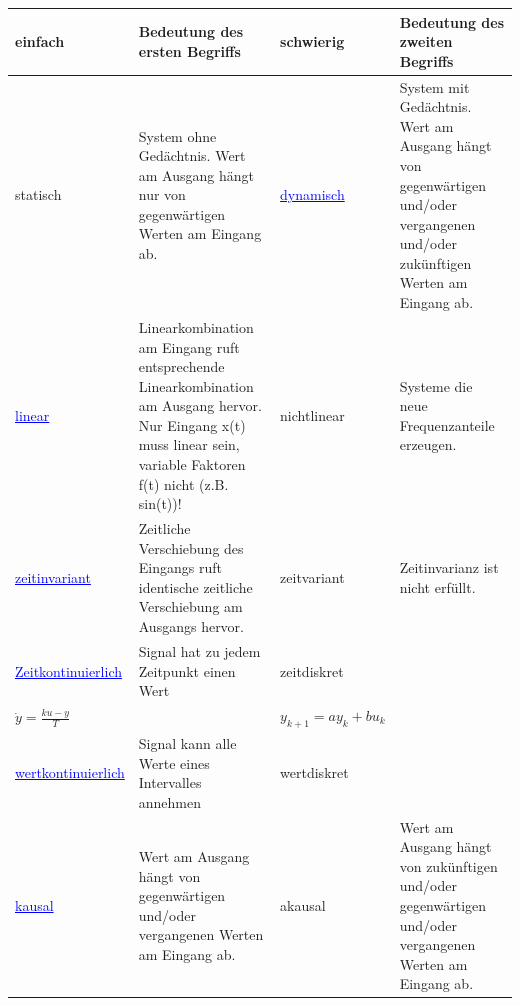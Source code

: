 		\begin{tabular}{|l|p{6.3cm}||l|p{6.3cm}|}
			
	        \hline
	        	
	        	einfach & 
	        	Bedeutung des \textbf{ersten} Begriffs & 
	        	schwierig & 	
	        	Bedeutung des \textbf{zweiten} Begriffs\\
	        \hline
	        	
	        	statisch &
	        	System ohne Gedächtnis.
	        	Wert am Ausgang hängt nur von gegenwärtigen
	        	Werten am Eingang ab.&
	        	\textcolor{blue}{\underline{dynamisch}} &
	        	System mit Gedächtnis.
	        	Wert am Ausgang hängt von gegenwärtigen
	        	und/oder vergangenen und/oder zukünftigen
	        	Werten am Eingang ab.\\
	        \hline
	        	
	        	\textcolor{blue}{\underline{linear}}	&
	        	Linearkombination am Eingang ruft
	        	entsprechende Linearkombination am
	        	Ausgang hervor.
	        	Nur Eingang x(t) muss linear sein,
	        	variable Faktoren f(t) nicht (z.B. sin(t))! &
	        	nichtlinear &
	        	Systeme die neue Frequenzanteile erzeugen.\\ %
	       	\hline
	        	
	        	\textcolor{blue}{\underline{zeitinvariant}} &
	        	Zeitliche Verschiebung des Eingangs ruft
	        	identische zeitliche Verschiebung am
	        	Ausgangs hervor. &
	        	zeitvariant	&
	        	Zeitinvarianz ist nicht erfüllt. \\
	        \hline
	        	
	        	\textcolor{blue}{\underline{Zeitkontinuierlich}} &
	        	Signal hat zu jedem Zeitpunkt einen Wert&
	        	zeitdiskret&
	        	\\
	        	$\dot{y}=\frac{ku-y}{T}$ &
	        	&
	        	$y_{k+1}=a y_k + b u_k$&
	        	\\
	        \hline
	        	
	        	\textcolor{blue}{\underline{wertkontinuierlich}}&
	        	Signal kann alle Werte eines Intervalles annehmen&
	        	wertdiskret&
	        	\\
	       	\hline
	        	
	        	\textcolor{blue}{\underline{kausal}}	&
	        	Wert am Ausgang hängt von gegenwärtigen 
	        	und/oder vergangenen Werten am Eingang ab.	&
	        	akausal&
	        	Wert am Ausgang hängt von zukünftigen
	        	und/oder gegenwärtigen und/oder vergangenen
	        	Werten am Eingang ab.\\
	       	\hline
	       

\end{tabular}

